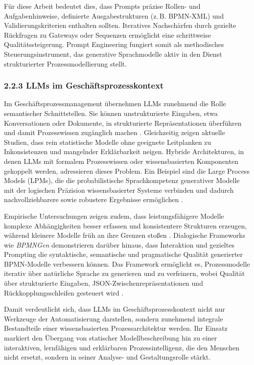 \documentclass[a4paper,12pt]{scrreprt}
\begin{document}
Für diese Arbeit bedeutet dies, dass Prompts präzise Rollen- und Aufgabenhinweise, definierte Ausgabestrukturen (z.\,B. BPMN-XML) und Validierungskriterien enthalten sollten. 
Iteratives Nachschärfen durch gezielte Rückfragen zu Gateways oder Sequenzen ermöglicht eine schrittweise Qualitätssteigerung. 
Prompt Engineering fungiert somit als methodisches Steuerungsinstrument, das generative Sprachmodelle aktiv in den Dienst strukturierter Prozessmodellierung stellt.


\subsubsection*{2.2.3 LLMs im Geschäftsprozesskontext}

Im Geschäftsprozessmanagement übernehmen \acp{LLM} zunehmend die Rolle semantischer Schnittstellen. 
Sie können unstrukturierte Eingaben, etwa Konversationen oder Dokumente, in strukturierte Repräsentationen überführen 
und damit Prozesswissen zugänglich machen \citep[S.~2--3]{Kourani2024}. 
Gleichzeitig zeigen aktuelle Studien, dass rein statistische Modelle ohne geeignete Leitplanken 
zu Inkonsistenzen und mangelnder Erklärbarkeit neigen. 
Hybride Architekturen, in denen \acp{LLM} mit formalem Prozesswissen oder wissensbasierten Komponenten gekoppelt werden, adressieren dieses Problem. 
Ein Beispiel sind die Large Process Models (LPMs), die die probabilistische Sprachkompetenz generativer Modelle 
mit der logischen Präzision wissensbasierter Systeme verbinden 
und dadurch nachvollziehbarere sowie robustere Ergebnisse ermöglichen \citep[S.~81--84]{KampikWarmuthRebmannLeiteKirchner2025}. 

Empirische Untersuchungen zeigen zudem, dass leistungsfähigere Modelle 
komplexe Abhängigkeiten besser erfassen und konsistentere Strukturen erzeugen, 
während kleinere Modelle früh an ihre Grenzen stoßen \citep[S.~6--8]{Kourani2024}. 
Dialogische Frameworks wie \emph{BPMNGen} demonstrieren darüber hinaus, dass Interaktion und gezieltes Prompting 
die syntaktische, semantische und pragmatische Qualität generierter BPMN-Modelle verbessern können. 
Das Framework ermöglicht es, Prozessmodelle iterativ über natürliche Sprache zu generieren und zu verfeinern, 
wobei Qualität über strukturierte Eingaben, JSON-Zwischenrepräsentationen und Rückkopplungsschleifen gesteuert wird 
\citep[S.~27--31]{Hoerner2025}. 

Damit verdeutlicht sich, dass \acp{LLM} im Geschäftsprozesskontext 
nicht nur Werkzeuge der Automatisierung darstellen, sondern zunehmend integrale Bestandteile einer wissensbasierten Prozessarchitektur werden. 
Ihr Einsatz markiert den Übergang von statischer Modellbeschreibung hin zu einer interaktiven, lernfähigen und erklärbaren Prozessintelligenz, 
die den Menschen nicht ersetzt, sondern in seiner Analyse- und Gestaltungsrolle stärkt.
\end{document}
